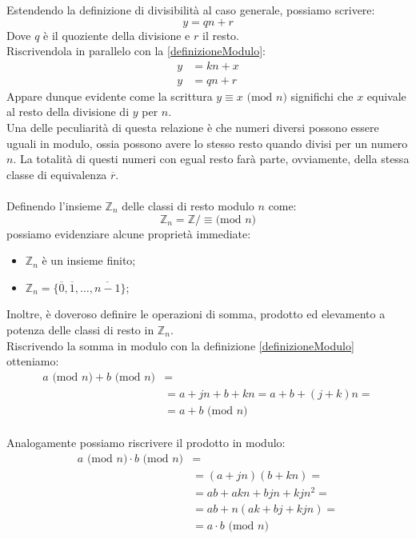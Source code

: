 Estendendo la definizione di divisibilità al caso generale, possiamo scrivere:
\begin{equation}
    y=qn+r
\end{equation}
Dove $q$ è il quoziente della divisione e $r$ il resto.\\
Riscrivendola in parallelo con la \eqref{definizioneModulo}:
\begin{equation} \label{parallelo}
\begin{split}
y & = kn+x \\
y & = qn+r
\end{split}
\end{equation}
Appare dunque evidente come la scrittura $y \equiv x \text{ (mod $n$)}$ significhi che $x$ equivale al resto della divisione di $y$ per $n$.\\
Una delle peculiarità di questa relazione è che numeri diversi possono essere uguali in modulo, ossia possono avere lo stesso resto quando divisi per un numero $n$. La totalità di questi numeri con egual resto farà parte, ovviamente, della stessa classe di equivalenza $\overline{r}$.\\\\
Definendo l'insieme $\mathbb{Z}_n$ delle classi di resto modulo $n$ come:
\begin{equation}\label{Zn}
\mathbb{Z}_n = \mathbb{Z}/\equiv \text{(mod $n$)}
\end{equation}
possiamo evidenziare alcune proprietà immediate:
\begin{itemize}
    \item $\mathbb{Z}_n$ è un insieme finito;
    \item $\mathbb{Z}_n=\{ \overline{0},\overline{1},\hdots,\overline{n-1}\}$;
\end{itemize}
Inoltre, è doveroso definire le operazioni di somma, prodotto ed elevamento a potenza delle classi di resto in $\mathbb{Z}_n$.\\
Riscrivendo la somma in modulo con la definizione \eqref{definizioneModulo} otteniamo:
\begin{equation}
\begin{split}
a \text{ (mod $n$)} + b \text{ (mod $n$)} & = \\
& = a+jn + b + kn = a+b + (j+k)n =\\
& = a+b\text{ (mod $n$)}
\end{split}
\end{equation}\\
Analogamente possiamo riscrivere il prodotto in modulo:
\begin{equation}
\begin{split}
a \text{ (mod $n$)} \cdot b \text{ (mod $n$)} & = \\
& = (a+jn) (b + kn) =\\
& = ab +akn +bjn +kjn^2=\\
& = ab + n(ak+bj+kjn)=\\
& = a\cdot b\text{ (mod $n$)}
\end{split}
\end{equation}
